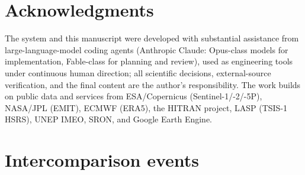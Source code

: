 \documentclass[11pt]{article}
\begin{document}
\section*{Acknowledgments}

The system and this manuscript were developed with substantial assistance
from large-language-model coding agents (Anthropic Claude: Opus-class
models for implementation, Fable-class for planning and review), used as
engineering tools under continuous human direction; all scientific
decisions, external-source verification, and the final content are the
author's responsibility. The work builds on public data and services from
ESA/Copernicus (Sentinel-1/-2/-5P), NASA/JPL (EMIT), ECMWF (ERA5), the
HITRAN project, LASP (TSIS-1 HSRS), UNEP IMEO, SRON, and Google Earth
Engine.




\appendix
\section{Intercomparison events}\label{app:events}
\end{document}
